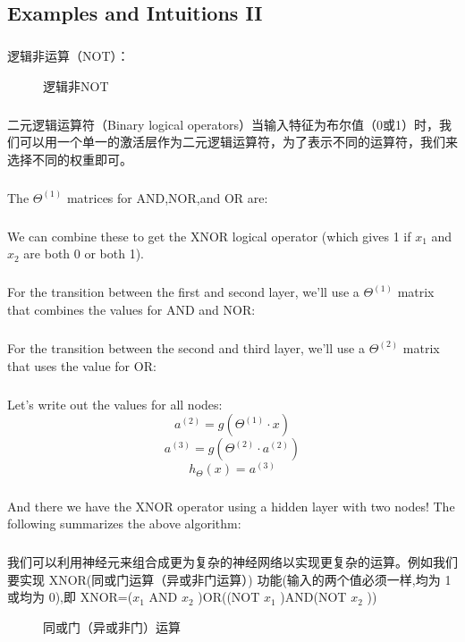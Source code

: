 \documentclass{article}
\begin{document}
\begin{CJK}{UTF8}{gbsn}
\subsection{Examples and Intuitions II}
\subparagraph{}
逻辑非运算（NOT）：
\begin{figure}[H]
\caption{逻辑非NOT}
\label{fig:424}
\end{figure}
\subparagraph{}
二元逻辑运算符（Binary logical operators）当输入特征为布尔值（0或1）时，我们可以用一个单一的激活层作为二元逻辑运算符，为了表示不同的运算符，我们来选择不同的权重即可。
\subparagraph{}
The $\Theta^{(1)}$ matrices for AND,NOR,and OR are:
\begin{figure}[H]
\label{fig:425}
\end{figure}
\subparagraph{}
We can combine these to get the XNOR logical operator (which gives 1 if $x_1$ and $x_2$ are both 0 or both 1).
\begin{figure}[H]
\label{fig:426}
\end{figure}
\subparagraph{}
For the transition between the first and second layer, we'll use a $\Theta^{(1)}$ matrix that combines the values for AND and NOR:
\begin{figure}[H]
\label{fig:427}
\end{figure}
\subparagraph{}
For the transition between the second and third layer, we'll use a $\Theta^{(2)}$ matrix that uses the value for OR:
\begin{figure}[H]
\label{fig:428}
\end{figure}
\subparagraph{}
Let's write out the values for all nodes:
\begin{equation}
a^{(2)}=g(\Theta^{(1)}\cdot{x})
\end{equation}
\begin{equation}
a^{(3)}=g(\Theta^{(2)}\cdot{a^{(2)}})
\end{equation}
\begin{equation}
h_\Theta(x)=a^{(3)}
\end{equation}
\subparagraph{}
And there we have the XNOR operator using a hidden layer with two nodes! The following summarizes the above algorithm:
\subparagraph{}
我们可以利用神经元来组合成更为复杂的神经网络以实现更复杂的运算。例如我们要实现 XNOR(同或门运算（异或非门运算）) 功能(输入的两个值必须一样,均为 1 或均为 0),即 XNOR=($x_1$ AND $x_2$ )OR((NOT $x_1$ )AND(NOT $x_2$ ))
\begin{figure}[H]
\caption{同或门（异或非门）运算}
\label{fig:430}
\end{figure}

\end{CJK}
\end{document}

